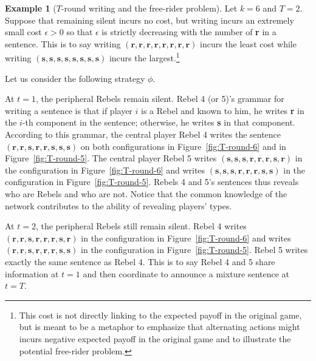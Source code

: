 \documentclass[12pt,letter]{article}
\theoremstyle{definition}
\newtheorem{example}{Example}
\theoremstyle{remark}
\theoremstyle{claim}
\begin{document}
\begin{example}[$T$-round writing and the free-rider problem]
\label{ex:cost_function_talk_fr}
Let $k=6$ and $T=2$. Suppose that remaining silent incurs no cost, but writing incurs an extremely small cost $\epsilon>0$ so that $\epsilon$ is strictly decreasing with the number of \textbf{r} in a sentence. This is to say writing $(\textbf{r},\textbf{r},\textbf{r},\textbf{r},\textbf{r},\textbf{r},\textbf{r},\textbf{r})$ incurs the least cost while writing $(\textbf{s},\textbf{s},\textbf{s},\textbf{s},\textbf{s},\textbf{s},\textbf{s},\textbf{s})$ incurs the largest.\footnote{This cost is not directly linking to the expected payoff in the original game, but is meant to be a metaphor to emphasize that alternating actions might incurs negative expected payoff in the original game and to illustrate the potential free-rider problem.} 

Let us consider the following strategy $\phi$. 

At $t=1$, the peripheral Rebels remain silent. Rebel 4 (or 5)'s grammar for writing a sentence is that if player $i$ is a Rebel and known to him, he writes \textbf{r} in the $i$-th component in the sentence; otherwise, he writes \textbf{s} in that component. According to this grammar, the central player Rebel 4 writes the sentence $(\textbf{r},\textbf{r},\textbf{s},\textbf{r},\textbf{r},\textbf{s},\textbf{s},\textbf{s})$ on both configurations in Figure~\ref{fig:T-round-6} and in Figure~\ref{fig:T-round-5}. The central player Rebel 5 writes $(\textbf{s},\textbf{s},\textbf{s},\textbf{r},\textbf{r},\textbf{r},\textbf{s},\textbf{r})$ in the configuration in Figure~\ref{fig:T-round-6} and writes $(\textbf{s},\textbf{s},\textbf{s},\textbf{r},\textbf{r},\textbf{r},\textbf{s},\textbf{s})$ in the configuration in Figure~\ref{fig:T-round-5}. Rebels 4 and 5's sentences thus reveals who are Rebels and who are not. Notice that the common knowledge of the network contributes to the ability of revealing players' types. 

At $t=2$, the peripheral Rebels still remain silent. Rebel 4 writes $(\textbf{r},\textbf{r},\textbf{s},\textbf{r},\textbf{r},\textbf{r},\textbf{s},\textbf{r})$ in the configuration in Figure~\ref{fig:T-round-6} and writes $(\textbf{r},\textbf{r},\textbf{s},\textbf{r},\textbf{r},\textbf{r},\textbf{s},\textbf{s})$ in the configuration in Figure~\ref{fig:T-round-5}. Rebel 5 writes exactly the same sentence as Rebel 4. This is to say Rebel 4 and 5 share information at $t=1$ and then coordinate to announce a mixture sentence at $t=T$. 


\end{example}
\end{document}
